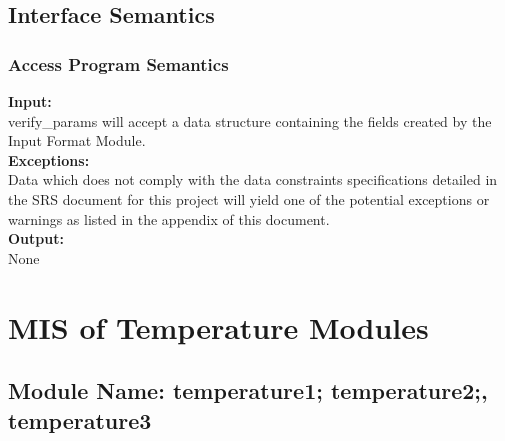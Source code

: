 \documentclass[12pt]{article}
\begin{document}
\subsection{Interface Semantics}

\subsubsection{Access Program Semantics}

\noindent \textbf{Input:}\\
verify\_{params} will accept a data structure containing the fields created by the Input Format Module.\\

\noindent \textbf{Exceptions:}\\
Data which does not comply with the data constraints specifications detailed in
the SRS document for this project will yield one of the potential exceptions or
warnings as listed in the appendix of this document.\\  

\noindent \textbf{Output:}\\
None


\section{MIS of Temperature Modules}

\subsection{Module Name: temperature1; temperature2;, temperature3}




\end{document}
